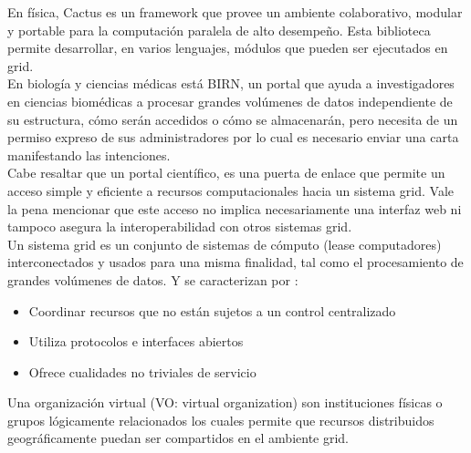 En física, Cactus\cite{Cactus} es un framework que provee un ambiente colaborativo, modular y portable para la computación paralela de alto desempeño. Esta biblioteca permite desarrollar, en varios lenguajes, módulos que pueden ser ejecutados en grid.\\

En biología y ciencias médicas está BIRN\cite{BIRN}, un portal que ayuda a investigadores en ciencias biomédicas a procesar grandes volúmenes de datos independiente de su estructura, cómo serán accedidos o cómo se almacenarán, pero necesita de un permiso expreso de sus administradores por lo cual es necesario enviar una carta manifestando las intenciones.\\
Cabe resaltar que un portal científico, es una puerta de enlace que permite un acceso simple y eficiente a recursos computacionales hacia un sistema grid. Vale la pena mencionar que este acceso no implica necesariamente una interfaz web ni tampoco asegura la interoperabilidad con otros sistemas grid.\\

Un sistema grid es un conjunto de sistemas de cómputo (lease computadores) interconectados y usados para una misma finalidad, tal como el procesamiento de grandes volúmenes de datos\cite{Foster}. Y se caracterizan por :

\begin{itemize}
\item Coordinar recursos que no están sujetos a un control centralizado
\item Utiliza protocolos e interfaces abiertos
\item Ofrece cualidades no triviales de servicio
\end{itemize}

Una organización virtual (VO: virtual organization) son instituciones físicas o grupos lógicamente relacionados los cuales permite que recursos distribuidos geográficamente  puedan ser compartidos en el ambiente grid.
